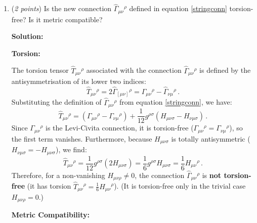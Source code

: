 \documentclass[12pt]{article}
\newcommand{\be}{\begin{equation}}
\newcommand{\ee}{\end{equation}}
\begin{document}
\begin{enumerate}[label=\alph*)]
\item (\emph{2 points}) Is the new connection $\hat\Gamma_{\mu\nu}{}^\rho$ defined in equation \eqref{stringconn} torsion-free? Is it metric compatible? 

\medskip
\noindent\textbf{Solution:}

\noindent\textbf{Torsion:}

The torsion tensor $\hat{T}_{\mu\nu}{}^\rho$ associated with the connection $\hat\Gamma_{\mu\nu}{}^\rho$ is defined by the antisymmetrisation of its lower two indices:
\be
\hat{T}_{\mu\nu}{}^\rho = 2 \hat\Gamma_{[\mu\nu]}{}^\rho = \hat\Gamma_{\mu\nu}{}^\rho - \hat\Gamma_{\nu\mu}{}^\rho \,.
\ee
Substituting the definition of $\hat\Gamma_{\mu\nu}{}^\rho$ from equation \eqref{stringconn}, we have:
\be
\hat{T}_{\mu\nu}{}^\rho = \left(\Gamma_{\mu\nu}{}^\rho - \Gamma_{\nu\mu}{}^\rho\right) + \frac{1}{12} g^{\rho\sigma} \left(H_{\mu\nu\sigma} - H_{\nu\mu\sigma}\right) \,.
\ee
Since $\Gamma_{\mu\nu}{}^\rho$ is the Levi-Civita connection, it is torsion-free ($\Gamma_{\mu\nu}{}^\rho = \Gamma_{\nu\mu}{}^\rho$), so the first term vanishes. Furthermore, because $H_{\mu\nu\sigma}$ is totally antisymmetric ($H_{\nu\mu\sigma} = -H_{\mu\nu\sigma}$), we find:
\be
\hat{T}_{\mu\nu}{}^\rho = \frac{1}{12} g^{\rho\sigma} (2 H_{\mu\nu\sigma}) = \frac{1}{6} g^{\rho\sigma} H_{\mu\nu\sigma} = \frac{1}{6} H_{\mu\nu}{}^\rho \,.
\ee
Therefore, for a non-vanishing $H_{\mu\nu\rho} \neq 0$, the connection $\hat\Gamma_{\mu\nu}{}^\rho$ is \textbf{not torsion-free} (it has torsion $\hat{T}_{\mu\nu}{}^\rho = \frac{1}{6} H_{\mu\nu}{}^\rho$). (It is torsion-free only in the trivial case $H_{\mu\nu\rho} = 0$.)

\medskip
\noindent\textbf{Metric Compatibility:}


\end{enumerate}
\end{document}
